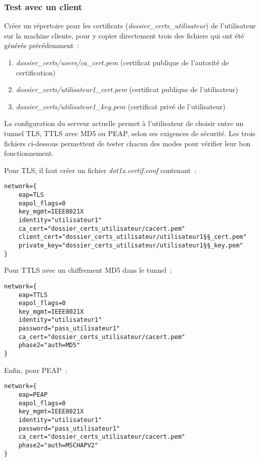 \label{tests-certificats}
\subsubsection{Test avec un client}

Créer un répertoire pour les certificats (\emph{dossier\_certs\_utilisateur}) de l'utilisateur sur la machine cliente, pour y copier directement trois des fichiers qui ont été générés précédemment~:

\begin{enumerate}
\item \emph{dossier\_certs/users/ca\_cert.pem} (certificat publique de l'autorité de certification)
\item \emph{dossier\_certs/utilisateur1\_cert.pem} (certificat publique de l'utilisateur)
\item \emph{dossier\_certs/utilisateur1\_key.pem} (certificat privé de l'utilisateur)
\end{enumerate}

La configuration du serveur actuelle permet à l'utilisateur de choisir entre un tunnel TLS, TTLS avec MD5 ou PEAP, selon ses exigences de sécurité. Les trois fichiers ci-dessous permettent de tester chacun des modes pour vérifier leur bon fonctionnement.

Pour TLS, il faut créer un fichier \emph{dot1x.certif.conf} contenant~:

\begin{lstlisting}
network={
    eap=TLS
    eapol_flags=0
    key_mgmt=IEEE8021X
    identity="utilisateur1"
    ca_cert="dossier_certs_utilisateur/cacert.pem"
    client_cert="dossier_certs_utilisateur/utilisateur1§§_cert.pem"
    private_key="dossier_certs_utilisateur/utilisateur1§§_key.pem"
}
\end{lstlisting}

Pour TTLS avec un chiffrement MD5 dans le tunnel~:

\begin{lstlisting}
network={
    eap=TTLS
    eapol_flags=0
    key_mgmt=IEEE8021X
    identity="utilisateur1"
    password="pass_utilisateur1"
    ca_cert="dossier_certs_utilisateur/cacert.pem"
    phase2="auth=MD5"
}
\end{lstlisting}

Enfin, pour PEAP~:

\begin{lstlisting}
network={
    eap=PEAP
    eapol_flags=0
    key_mgmt=IEEE8021X
    identity="utilisateur1"
    password="pass_utilisateur1"
    ca_cert="dossier_certs_utilisateur/cacert.pem"
    phase2="auth=MSCHAPV2"
}
\end{lstlisting}

